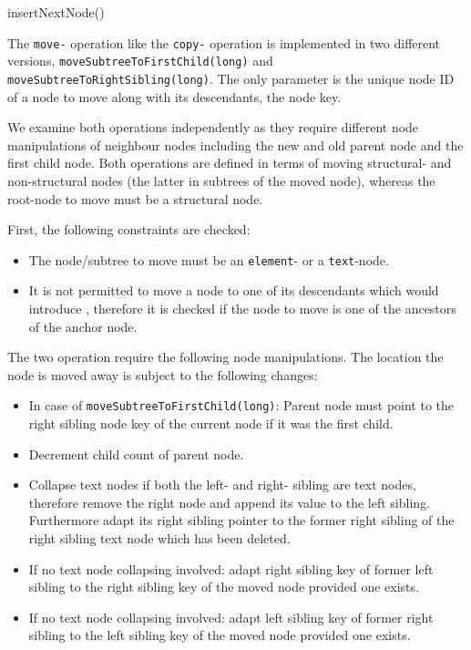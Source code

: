 \begin{algorithm}[Hhtbp]
\BlankLine
{}

\caption{insertNextNode()}\label{insertNextNode}
\end{algorithm}

The \texttt{move-} operation like the \texttt{copy-} operation is implemented in two different versions, \texttt{moveSubtreeToFirstChild(long)} and \\\texttt{moveSubtreeToRightSibling(long)}. The only parameter is the unique node ID of a node to move along with its descendants, the node key.

We examine both operations independently as they require different node manipulations of neighbour nodes including the new and old parent node and the first child node. Both operations are defined in terms of moving structural- and non-structural nodes (the latter in subtrees of the moved node), whereas the root-node to move must be a structural node.

First, the following constraints are checked:

\begin{itemize}
\item The node/subtree to move must be an \texttt{element}- or a \texttt{text}-node.
\item It is not permitted to move a node to one of its descendants which would introduce , therefore it is checked if the node to move is one of the ancestors of the anchor node.
\end{itemize}

The two operation require the following node manipulations. The location the node is moved away is subject to the following changes:
\begin{itemize}
\item In case of \texttt{moveSubtreeToFirstChild(long)}: Parent node must point to the right sibling node key of the current node if it was the first child.
\item Decrement child count of parent node.
\item Collapse text nodes if both the left- and right- sibling are text nodes, therefore remove the right node and append its value to the left sibling. Furthermore adapt its right sibling pointer to the former right sibling of the right sibling text node which has been deleted.
\item If no text node collapsing involved: adapt right sibling key of former left sibling to the right sibling key of the moved node provided one exists.
\item If no text node collapsing involved: adapt left sibling key of former right sibling to the left sibling key of the moved node provided one exists.
\end{itemize}

